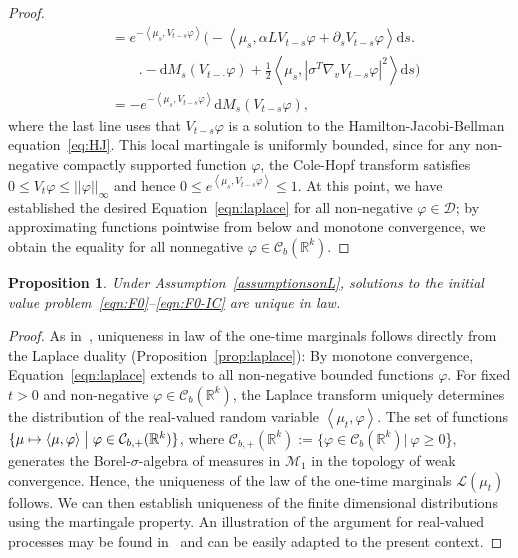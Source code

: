 \documentclass{article}
\newcommand{\dd}{\text{d}}
\newcommand{\av}[1]{\left<#1\right>}
\newtheorem{proposition}[theorem]{Proposition}
\newcommand{\R}{\mathbb{R}}
\newcommand{\C}{\mathcal C}
\begin{document}
\begin{proof}
\begin{align*}
                                        &=   e^{-\av{\mu_s, V_{t-s}\varphi}} \biggl( -\av{\mu_s, \alpha L V_{t-s}\varphi
                                          + \partial_s V_{t-s} \varphi } \dd s \biggr. \\ &{}\qquad \biggl. - \dd M_s(V_{t-\cdot}\varphi) + \frac{1}{2} \av{\mu_s, |\sigma^T\nabla_v V_{t-s} \varphi|^2} \dd s \biggr)\\
		&= -e^{-\av{\mu_s, V_{t-s}\varphi}}\dd M_s(V_{t-s}\varphi) , 
  \end{align*}
  where the last line uses that $V_{t-s} \varphi$ is a solution to the Hamilton-Jacobi-Bellman
  equation~\eqref{eq:HJ}.  This local martingale is uniformly bounded, since for any non-negative compactly
  supported function $\varphi$, the Cole-Hopf transform satisfies $0 \leq V_t \varphi \leq ||\varphi||_\infty$
  and hence $0 \leq e^{\av{\mu_s, V_{t-s}\varphi}} \leq 1$.  At this point, we have established the desired
  Equation~\eqref{eqn:laplace} for all non-negative $\varphi \in \mathcal{D}$; by approximating functions
  pointwise from below and monotone convergence, we obtain the equality for all nonnegative
  $\varphi \in \C_b(\R^k)$.
\end{proof}

\begin{proposition}
  \label{lemma:uniqueness}
  Under Assumption~\ref{assumptionsonL}, solutions to the initial value
  problem~\eqref{eqn:F0}--\eqref{eqn:F0-IC} are unique in law.
\end{proposition}
 
\begin{proof}
  As in~\cite{Konarovskyi2019a}, uniqueness in law of the one-time marginals follows directly from the Laplace
  duality (Proposition~\ref{prop:laplace}): By monotone convergence, Equation~\eqref{eqn:laplace} extends to
  all non-negative bounded functions $\varphi$. For fixed $t >0$ and non-negative $\varphi \in \C_b(\R^k)$,
  the Laplace transform uniquely determines the distribution of the real-valued random variable
  $\av{\mu_t, \varphi}$.  The set of functions
  $\{\mu \mapsto \av{\mu, \varphi} \bigm| \varphi \in \C_{b,+}(\R^k)\}$, where
  $\C_{b,+}(\R^k):= \{\varphi \in \C_b(\R^k)|~\varphi \geq 0$\}, generates the Borel-$\sigma$-algebra of
  measures in $\mathcal M_1$ in the topology of weak convergence. Hence, the uniqueness of the law of the
  one-time marginals $\mathcal L(\mu_t)$ follows.  We can then establish uniqueness of the finite dimensional
  distributions using the martingale property.  An illustration of the argument for real-valued processes may
  be found in~\cite[Chapter 3.4]{Ethier1986a} and can be easily adapted to the present context.
\end{proof}
\end{document}
